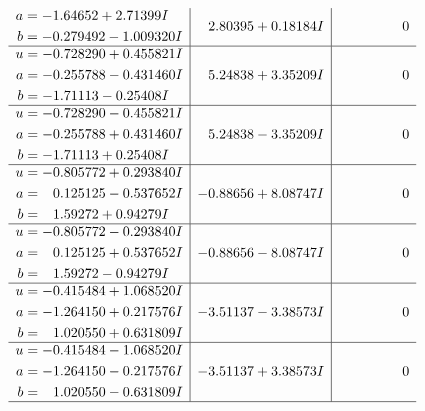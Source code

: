 \documentclass[1p]{elsarticle_modified}
\theoremstyle{definition}
\begin{document}
$$\begin{array}{c|c|c}
\begin{aligned}
a &= -1.64652 + 2.71399 I \\
b &= -0.279492 - 1.009320 I\end{aligned}
 & \phantom{-}2.80395 + 0.18184 I & \phantom{-0.000000 } 0 \\ \hline\begin{aligned}
u &= -0.728290 + 0.455821 I \\
a &= -0.255788 - 0.431460 I \\
b &= -1.71113 - 0.25408 I\end{aligned}
 & \phantom{-}5.24838 + 3.35209 I & \phantom{-0.000000 } 0 \\ \hline\begin{aligned}
u &= -0.728290 - 0.455821 I \\
a &= -0.255788 + 0.431460 I \\
b &= -1.71113 + 0.25408 I\end{aligned}
 & \phantom{-}5.24838 - 3.35209 I & \phantom{-0.000000 } 0 \\ \hline\begin{aligned}
u &= -0.805772 + 0.293840 I \\
a &= \phantom{-}0.125125 - 0.537652 I \\
b &= \phantom{-}1.59272 + 0.94279 I\end{aligned}
 & -0.88656 + 8.08747 I & \phantom{-0.000000 } 0 \\ \hline\begin{aligned}
u &= -0.805772 - 0.293840 I \\
a &= \phantom{-}0.125125 + 0.537652 I \\
b &= \phantom{-}1.59272 - 0.94279 I\end{aligned}
 & -0.88656 - 8.08747 I & \phantom{-0.000000 } 0 \\ \hline\begin{aligned}
u &= -0.415484 + 1.068520 I \\
a &= -1.264150 + 0.217576 I \\
b &= \phantom{-}1.020550 + 0.631809 I\end{aligned}
 & -3.51137 - 3.38573 I & \phantom{-0.000000 } 0 \\ \hline\begin{aligned}
u &= -0.415484 - 1.068520 I \\
a &= -1.264150 - 0.217576 I \\
b &= \phantom{-}1.020550 - 0.631809 I\end{aligned}
 & -3.51137 + 3.38573 I & \phantom{-0.000000 } 0\\
 \hline 
 \end{array}$$\newpage$$\begin{array}{c|c|c}  

\end{array}$$
\end{document}
